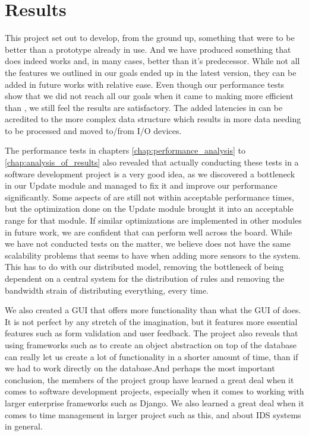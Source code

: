 \section{Results}
This project set out to develop, from the ground up, something that were to be
better than a prototype already in use. And we have produced something that does
indeed works and, in many cases, better than it's predecessor. While not all the
features we outlined in our goals ended up in the latest version, they can be
added in future works with relative ease. Even though our performance tests show
that we did not reach all our goals when it came to making \snowman{} more
efficient than \bhtb{}, we still feel the results are satisfactory. The added
latencies in \snowman{} can be acredited to the more complex data structure
which results in more data needing to be processed and moved to/from I/O
devices.

The performance tests in chapters \ref{chap:performance_analysis} to
\ref{chap:analysis_of_results} also revealed that actually conducting these
tests in a software development project is a very good idea, as we discovered a
bottleneck in our Update module and managed to fix it and improve our
performance significantly. Some aspects of \snowman{} are still not within
acceptable performance times, but the optimization done on the Update module
brought it into an acceptable range for that module. If similar optimizations
are implemented in other modules in future work, we are confident that
\snowman{} can perform well across the board. While we have not conducted tests
on the matter, we believe \snowman{} does not have the same scalability problems
that \bhtb{} seems to have when adding more sensors to the system. This has to
do with our distributed model, removing the bottleneck of being dependent on a
central system for the distribution of rules and removing the bandwidth strain
of distributing everything, every time.

We also created a GUI that offers more functionality than what the GUI of
\bhtb{} does. It is not perfect by any stretch of the imagination, but it
features more essential features such as form validation and user feedback. The
project also reveals that using frameworks such as \django{} to create an object
abstraction on top of the database can really let us create a lot of
functionality in a shorter amount of time, than if we had to work directly on
the database.And perhaps the most important conclusion, the members of the
project group have learned a great deal when it comes to software development
projects, especially when it comes to working with larger enterprise frameworks
such as Django. We also learned a great deal when it comes to time management in
larger project such as this, and about IDS systems in general.


